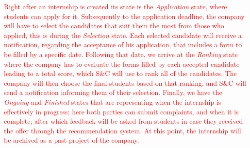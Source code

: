 \documentclass[11pt,twoside]{article}
\begin{document}
\textcolor{red}{Right after an internship is created its state is the \textit{Application} state, where students can apply for it. Subsequently to the application deadline, the company will have to select the candidates that suit them the most from those who applied, this is during the \textit{Selection} state. Each selected candidate will receive a notification, regarding the acceptance of his application, that includes a form to be filled by a specific date. Following that date, we arrive at the \textit{Ranking} state where the company has to evaluate the forms filled by each accepted candidate leading to a total score, which S\&C will use to rank all of the candidates. The company will then choose the final students based on that ranking, and S\&C will send a notification informing them of their selection. Finally, we have the \textit{Ongoing} and \textit{Finished} states that are representing when the internship is effectively in progress; here both parties can submit complaints, and when it is complete; after which feedback will be asked from students in case they received the offer through the recommendation system. At this point, the internship will be archived as a past project of the company.}
\end{document}
